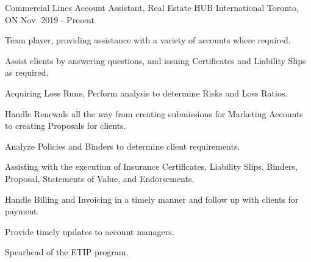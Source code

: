 


\begin{cventries}

\cventry
{Commercial Lines Account Assistant, Real Estate} %
{HUB International} %
{Toronto, ON} %
{Nov. 2019 - Present} %
{ %
\begin{cvitems}
\item {Team player, providing assistance with a variety of accounts where required.}
\item {Assist clients by answering questions, and issuing Certificates and Liability Slips as required.}
\item {Acquiring Loss Runs, Perform analysis to determine Risks and Loss Ratios.}
\item {Handle Renewals all the way from creating submissions for Marketing Accounts to creating Proposals for clients.}
\item {Analyze Policies and Binders to determine client requirements.}
\item {Assisting with the execution of Insurance Certificates, Liability Slips, Binders, Proposal, Statements of Value, and Endorsements.}
\item {Handle Billing and Invoicing in a timely manner and follow up with clients for payment.}
\item {Provide timely updates to account managers.}
\item {Spearhead of the ETIP program.}
\end{cvitems}
}



\end{cventries}
